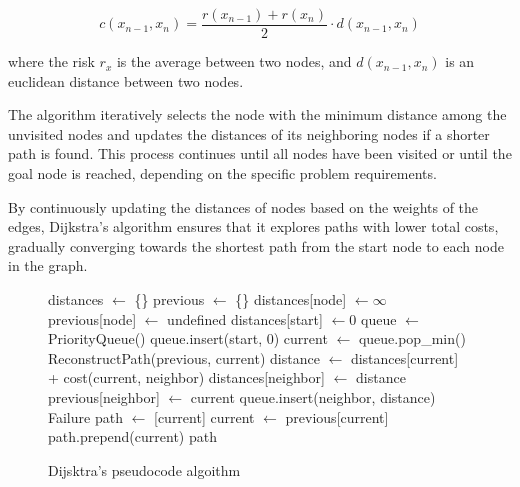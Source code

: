 \documentclass[12pt]{report}
\begin{document}
        \begin{equation}
        c(x_{n-1}, x_n) = \frac{r(x_{n-1}) + r(x_n)}{2} \cdot d(x_{n-1}, x_n)
        \end{equation}
        
        where the risk $r_x$ is the average between two nodes, and $d(x_{n-1}, x_n)$ is an euclidean distance between
        two nodes.
        
        The algorithm iteratively selects the node with the minimum distance among the unvisited nodes and updates the
        distances of its neighboring nodes if a shorter path is found. This process continues until all nodes have been
        visited or until the goal node is reached, depending on the specific problem requirements.

        By continuously updating the distances of nodes based on the weights of the edges, Dijkstra's algorithm ensures
        that it explores paths with lower total costs, gradually converging towards the shortest path from the start
        node to each node in the graph.

        \begin{figure}[H]
        \begin{algorithmic}[1]
            \State distances $\gets$ \{\}
            \State previous $\gets$ \{\}
                \State distances[node] $\gets \infty$
                \State previous[node] $\gets$ undefined
            \EndFor
            \State distances[start] $\gets 0$
            \State queue $\gets$ PriorityQueue()
            \State queue.insert(start, 0)
                \State current $\gets$ queue.pop\_min()
                    \State \Return ReconstructPath(previous, current)
                \EndIf
                    \State distance $\gets$ distances[current] + cost(current, neighbor)
                        \State distances[neighbor] $\gets$ distance
                        \State previous[neighbor] $\gets$ current
                        \State queue.insert(neighbor, distance)
                    \EndIf
                \EndFor
            \EndWhile
            \State \Return Failure
        \EndFunction
        \Statex
            \State path $\gets$ [current]
                \State current $\gets$ previous[current]
                \State path.prepend(current)
            \EndWhile
            \State \Return path
        \EndFunction
        \end{algorithmic}
        \caption{Dijsktra's pseudocode algoithm}
        \end{figure}
\end{document}

